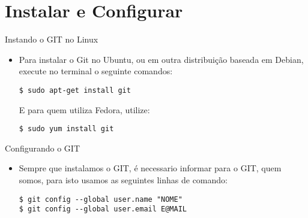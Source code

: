 \section{Instalar e Configurar}

\begin{slide}[method=direct]{Instando o GIT no Linux}
	\begin{itemize}
	\item{Para instalar o Git no Ubuntu, ou em outra distribuição baseada em Debian, execute no terminal o seguinte comandos:}
		\begin{lstlisting}[style=Bash]
$ sudo apt-get install git
		\end{lstlisting}
	
		E para quem utiliza Fedora, utilize:
	
		\begin{lstlisting}[style=Bash]
$ sudo yum install git
		\end{lstlisting}
	\end{itemize}
\end{slide}

\begin{slide}[method=direct]{Configurando o GIT}
	\begin{itemize}
	\item{Sempre que instalamos o GIT, é necessario informar para o GIT, quem somos, para isto usamos as seguintes linhas de comando:
		\begin{lstlisting}[style=Bash]
$ git config --global user.name "NOME"
$ git config --global user.email E@MAIL
		\end{lstlisting}}
	\end{itemize}
\end{slide}
